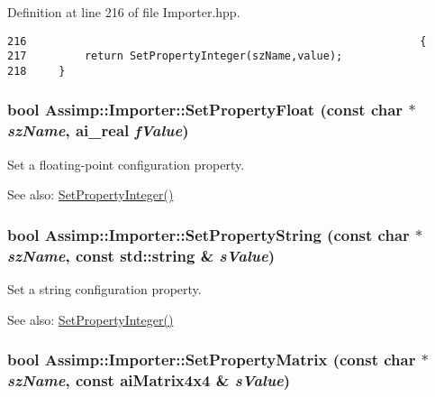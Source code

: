 Definition at line 216 of file Importer.hpp.

\begin{Code}\begin{verbatim}216                                                             {
217         return SetPropertyInteger(szName,value);
218     }
\end{verbatim}
\end{Code}


\hypertarget{class_assimp_1_1_importer_d38af78d6fe4b1f132d2534d8a84deea}{
\subsubsection[SetPropertyFloat]{\setlength{\rightskip}{0pt plus 5cm}bool Assimp::Importer::SetPropertyFloat (const char $\ast$ {\em szName}, \/  ai\_\-real {\em fValue})}}
\label{class_assimp_1_1_importer_d38af78d6fe4b1f132d2534d8a84deea}


Set a floating-point configuration property. \begin{Desc}
\item[See also:]\hyperlink{class_assimp_1_1_importer_2542eed3d5f491025c4095b4e55fa068}{SetPropertyInteger()} \end{Desc}
\hypertarget{class_assimp_1_1_importer_854087b213981108e3e464cf4d293fed}{
\subsubsection[SetPropertyString]{\setlength{\rightskip}{0pt plus 5cm}bool Assimp::Importer::SetPropertyString (const char $\ast$ {\em szName}, \/  const std::string \& {\em sValue})}}
\label{class_assimp_1_1_importer_854087b213981108e3e464cf4d293fed}


Set a string configuration property. \begin{Desc}
\item[See also:]\hyperlink{class_assimp_1_1_importer_2542eed3d5f491025c4095b4e55fa068}{SetPropertyInteger()} \end{Desc}
\hypertarget{class_assimp_1_1_importer_cd128e5fb5777ef238b8bd1454a9c3ad}{
\subsubsection[SetPropertyMatrix]{\setlength{\rightskip}{0pt plus 5cm}bool Assimp::Importer::SetPropertyMatrix (const char $\ast$ {\em szName}, \/  const aiMatrix4x4 \& {\em sValue})}}
\label{class_assimp_1_1_importer_cd128e5fb5777ef238b8bd1454a9c3ad}


